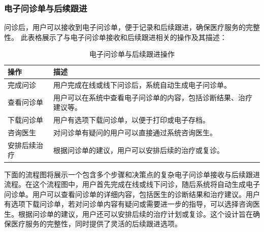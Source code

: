 \subsubsection{电子问诊单与后续跟进}
问诊后，用户可以接收到电子问诊单，便于记录和后续跟进，确保医疗服务的完整性。
此表格展示了与电子问诊单接收和后续跟进相关的操作及其描述：
\begin{table}[htbp]
	\centering
	\begin{tabular}{|p{6cm}|p{6cm}|}
		\hline
		\textbf{操作} & \textbf{描述} \\
		\hline
		完成问诊 & 用户完成在线或线下问诊后，系统自动生成电子问诊单。 \\
		查看问诊单 & 用户可以在系统中查看电子问诊单的内容，包括诊断结果、治疗建议等。 \\
		下载问诊单 & 用户有选项下载问诊单，以便于打印或电子存档。 \\
		咨询医生 & 对问诊单有疑问的用户可以直接通过系统咨询医生。 \\
		安排后续治疗 & 根据问诊单的建议，用户可以安排后续的治疗或复诊。 \\
		\hline
	\end{tabular}
	\caption{电子问诊单与后续跟进操作}
\end{table}
下面的流程图将展示一个包含多个步骤和决策点的复杂电子问诊单接收与后续跟进流程。在这个流程图中，用户首先完成在线或线下问诊，随后系统将自动生成电子问诊单。用户可以查看问诊单的详细内容，包括医生的诊断结果和治疗建议。用户有选项下载问诊单，若对问诊单内容有疑问或需要进一步的指导，可以选择咨询医生。根据问诊单的建议，用户还可以安排后续的治疗计划或复诊。这个设计旨在确保医疗服务的完整性，同时提供了灵活的后续跟进选项。

